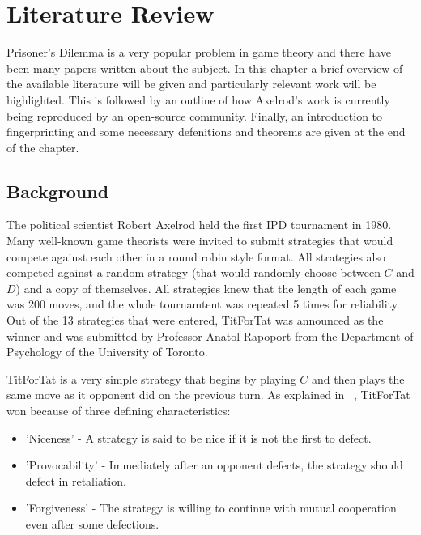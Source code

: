 
\chapter{Literature Review}\label{cha:literature_review}

Prisoner's Dilemma is a very popular problem in game theory and there have been many papers written about the subject.
In this chapter a brief overview of the available literature will be given and particularly relevant work will be highlighted.
This is followed by an outline of how Axelrod's work is currently being reproduced by an open-source community.
Finally, an introduction to fingerprinting and some necessary defenitions and theorems are given at the end of the chapter.


\section{Background}

The political scientist Robert Axelrod held the first IPD tournament in 1980.
Many well-known game theorists were invited to submit strategies that would compete against each other in a round robin style format.
All strategies also competed against a random strategy (that would randomly choose between $C$ and $D$) and a copy of themselves.
All strategies knew that the length of each game was 200 moves, and the whole tournamtent was repeated 5 times for reliability.
Out of the 13 strategies that were entered, TitForTat was announced as the winner and was submitted by Professor Anatol Rapoport from the Department of Psychology of the
University of Toronto.

TitForTat is a very simple strategy that begins by playing $C$ and then plays the same move as it opponent did on the previous turn.
As explained in ~\cite{Axelrod1980}, TitForTat won because of three defining characteristics:

\begin{itemize}
    \item 'Niceness' - A strategy is said to be nice if it is not the first to defect.
    \item 'Provocability' - Immediately after an opponent defects, the strategy should defect in retaliation.
    \item 'Forgiveness' - The strategy is willing to continue with mutual cooperation even after some defections.
\end{itemize}

